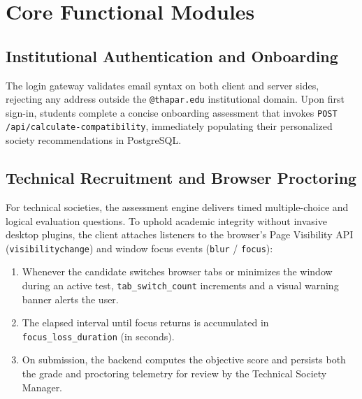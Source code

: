 \documentclass[12pt,a4paper]{report}
\begin{document}
\chapter{Core Functional Modules}

\section{Institutional Authentication and Onboarding}
The login gateway validates email syntax on both client and server sides, rejecting any address outside the \texttt{@thapar.edu} institutional domain. Upon first sign-in, students complete a concise onboarding assessment that invokes \texttt{POST /api/calculate-compatibility}, immediately populating their personalized society recommendations in PostgreSQL.

\section{Technical Recruitment and Browser Proctoring}
For technical societies, the assessment engine delivers timed multiple-choice and logical evaluation questions. To uphold academic integrity without invasive desktop plugins, the client attaches listeners to the browser's Page Visibility API (\texttt{visibilitychange}) and window focus events (\texttt{blur} / \texttt{focus}):
\begin{enumerate}[noitemsep]
    \item Whenever the candidate switches browser tabs or minimizes the window during an active test, \texttt{tab\_switch\_count} increments and a visual warning banner alerts the user.
    \item The elapsed interval until focus returns is accumulated in \texttt{focus\_loss\_duration} (in seconds).
    \item On submission, the backend computes the objective score and persists both the grade and proctoring telemetry for review by the Technical Society Manager.
\end{enumerate}
\end{document}
